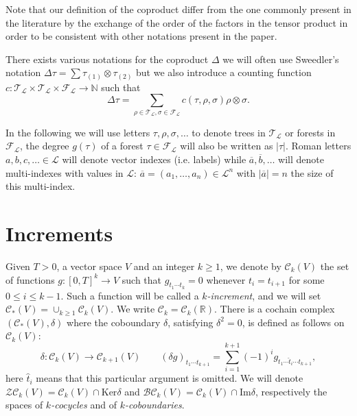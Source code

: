 \documentclass[a4paper,11pt,reqno]{article}
\newcommand{\ol}[1]{\overline{#1}}
\newcommand{\cB}{\mathcal{B}}
\newcommand{\cZ}{\mathcal{Z}}
\newcommand{\1}{{\bf 1}}
\newcommand{\RR}{\mathbb{R}}
\newcommand{\NN}{\mathbb{N}}
\newcommand{\FF}{\mathcal{F}}
\newcommand{\CC}{\mathcal{C}}
\newcommand{\LL}{\mathcal{L}}
\newcommand{\cl}{\mathcal L}
\newcommand{\TT}{\mathcal{T}}
\begin{document}
Note that our definition of the coproduct differ from the one commonly
present in the literature by the exchange of the order of the factors
in the tensor product in order to be consistent with other notations
present in the paper. 

There exists various notations for the coproduct $\Delta$ we will often use Sweedler's notation $\Delta \tau = \sum \tau_{(1)} \otimes \tau_{(2)}$ but we also introduce a counting function $c : \TT_\cl \times \TT_\cl \times \FF_\cl \to \NN$ such that
$$
\Delta \tau = \sum_{\rho \in \TT_\cl, \sigma \in \FF_\cl} c(\tau,\rho, \sigma) \rho \otimes \sigma.
$$

In the following we will use letters $\tau,\rho,\sigma,\dots$ to
denote trees in $\TT_\cl$ or forests  in $\FF_\LL$, the degree $g(\tau)$ of a forest $\tau \in \FF_\cl$ will also be written as $|\tau|$. Roman letters $a,b,c,\dots \in \LL$ will denote vector  indexes (i.e. labels) while $\ol{a},\ol{b},\dots$ will denote multi-indexes with values in $\LL$: $\overline{a}=(a_1,\dots,a_n) \in \LL^n$ with $|\overline a|=n$ the size of this multi-index.

\section{Increments}
\label{incr}
Given $T > 0$, a vector space $V$ and an integer $k \ge 1$, we denote by
$\CC_k(V)$ the set of functions $g : [0,T]^{k} \to V$
 such
that $g_{t_1 \cdots t_{k}} = 0$
whenever $t_i = t_{i+1}$ for some $0 \le i \le k-1$.
Such a function will be called a 
\emph{$k$-increment}, and we will
set $\CC_*(V)=\cup_{k\ge 1}\CC_k(V)$. We write $\CC_k =
\CC_k(\RR)$. There is a cochain complex $(\CC_*(V),\delta)$ where the coboundary $\delta$, satisfying $\delta^2 = 0$, is defined as follows on $\CC_k(V)$:
\begin{equation}
  \label{eq:coboundary}
\delta : \CC_k(V) \to \CC_{k+1}(V) \qquad 
(\delta g)_{t_1 \cdots t_{k+1}} = \sum_{i=1}^{k+1} (-1)^i g_{t_1
  \cdots \hat t_i \cdots t_{k+1}} , 
\end{equation}
here $\hat t_i$ means that this particular argument is omitted. 
 We will denote $\cZ\CC_k(V) = \CC_k(V) \cap \text{Ker}\delta$ 
and $\cB \CC_k(V) =
\CC_k(V) \cap \text{Im}\delta$, respectively the spaces of
\emph{$k$-cocycles} and of \emph{$k$-coboundaries}.
\end{document}
